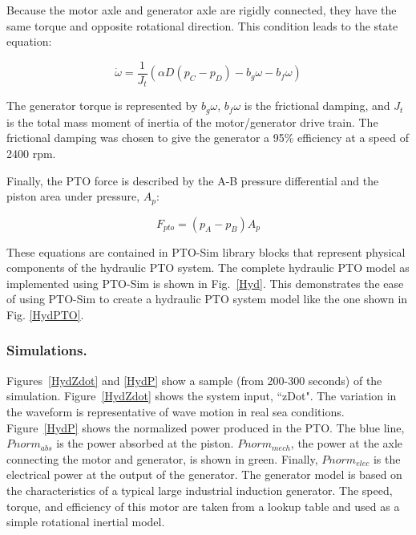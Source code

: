 \documentclass[twocolumn,10pt]{asme2e}
\begin{document}
Because the motor axle and generator axle are rigidly connected, they have the same torque and opposite rotational direction. This condition leads to the state equation:

\begin{equation}
\dot{\omega}=\frac{1}{J_t}(\alpha D (p_C-p_D)-b_g \omega-b_f \omega)
\end{equation}

The generator torque is represented by $b_g$$\omega$, $b_f$$\omega$ is the frictional damping, and $J_t$ is the total mass moment of inertia of the motor/generator drive train.  The frictional damping was chosen to give the generator a 95\% efficiency at a speed of 2400 rpm. 

Finally, the PTO force is described by the A-B pressure differential and the piston area under pressure, $A_p$:

\begin{equation}
F_{pto}=(p_A-p_B)A_p
\end{equation}

These equations are contained in PTO-Sim library blocks that represent physical components of the hydraulic PTO system. The complete hydraulic PTO model as implemented using PTO-Sim is shown in Fig.~\ref{Hyd}. This demonstrates the ease of using PTO-Sim to create a hydraulic PTO system model like the one shown in Fig. \ref{HydPTO}.

\subsubsection*{Simulations.}

Figures~\ref{HydZdot} and \ref{HydP} show a sample (from 200-300 seconds) of the simulation. Figure~\ref{HydZdot} shows the system input, ``zDot". The variation in the waveform is representative of wave motion in real sea conditions. Figure~\ref{HydP} shows the normalized power produced in the PTO. The blue line, $Pnorm_{abs}$ is the power absorbed at the piston. $Pnorm_{mech}$, the power at the axle connecting the motor and generator, is shown in green. Finally, $Pnorm_{elec}$ is the electrical power at the output of the generator. The generator model is based on the characteristics of a typical large industrial induction generator. The speed, torque, and efficiency of this motor are taken from a lookup table and used as a simple rotational inertial model. 

\end{document}
